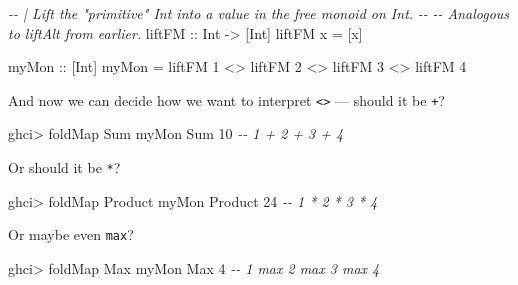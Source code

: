 \documentclass[]{article}
\newenvironment{Shaded}{}{}
\newcommand{\CommentTok}[1]{\textcolor[rgb]{0.38,0.63,0.69}{\textit{#1}}}
\newcommand{\DataTypeTok}[1]{\textcolor[rgb]{0.56,0.13,0.00}{#1}}
\newcommand{\DecValTok}[1]{\textcolor[rgb]{0.25,0.63,0.44}{#1}}
\newcommand{\FunctionTok}[1]{\textcolor[rgb]{0.02,0.16,0.49}{#1}}
\newcommand{\NormalTok}[1]{#1}
\newcommand{\OperatorTok}[1]{\textcolor[rgb]{0.40,0.40,0.40}{#1}}
\newcommand{\OtherTok}[1]{\textcolor[rgb]{0.00,0.44,0.13}{#1}}
\begin{document}
\begin{Shaded}
\begin{Highlighting}[]
\CommentTok{{-}{-} | Lift the "primitive" \textasciigrave{}Int\textasciigrave{} into a value in the free monoid on \textasciigrave{}Int\textasciigrave{}.}
\CommentTok{{-}{-}}
\CommentTok{{-}{-} Analogous to \textasciigrave{}liftAlt\textasciigrave{} from earlier.}
\OtherTok{liftFM ::} \DataTypeTok{Int} \OtherTok{{-}\textgreater{}}\NormalTok{ [}\DataTypeTok{Int}\NormalTok{]}
\NormalTok{liftFM x }\OtherTok{=}\NormalTok{ [x]}

\OtherTok{myMon ::}\NormalTok{ [}\DataTypeTok{Int}\NormalTok{]}
\NormalTok{myMon }\OtherTok{=}\NormalTok{ liftFM }\DecValTok{1} \OperatorTok{\textless{}\textgreater{}}\NormalTok{ liftFM }\DecValTok{2} \OperatorTok{\textless{}\textgreater{}}\NormalTok{ liftFM }\DecValTok{3} \OperatorTok{\textless{}\textgreater{}}\NormalTok{ liftFM }\DecValTok{4}
\end{Highlighting}
\end{Shaded}

And now we can decide how we want to interpret
\texttt{\textless{}\textgreater{}} --- should it be \texttt{+}?

\begin{Shaded}
\begin{Highlighting}[]
\NormalTok{ghci}\OperatorTok{\textgreater{}} \FunctionTok{foldMap} \DataTypeTok{Sum}\NormalTok{ myMon}
\DataTypeTok{Sum} \DecValTok{10}              \CommentTok{{-}{-} 1 + 2 + 3 + 4}
\end{Highlighting}
\end{Shaded}

Or should it be \texttt{*}?

\begin{Shaded}
\begin{Highlighting}[]
\NormalTok{ghci}\OperatorTok{\textgreater{}} \FunctionTok{foldMap} \DataTypeTok{Product}\NormalTok{ myMon}
\DataTypeTok{Product} \DecValTok{24}          \CommentTok{{-}{-} 1 * 2 * 3 * 4}
\end{Highlighting}
\end{Shaded}

Or maybe even \texttt{max}?

\begin{Shaded}
\begin{Highlighting}[]
\NormalTok{ghci}\OperatorTok{\textgreater{}} \FunctionTok{foldMap} \DataTypeTok{Max}\NormalTok{ myMon}
\DataTypeTok{Max} \DecValTok{4}          \CommentTok{{-}{-} 1 \textasciigrave{}max\textasciigrave{} 2 \textasciigrave{}max\textasciigrave{} 3 \textasciigrave{}max\textasciigrave{} 4}
\end{Highlighting}
\end{Shaded}
\end{document}
